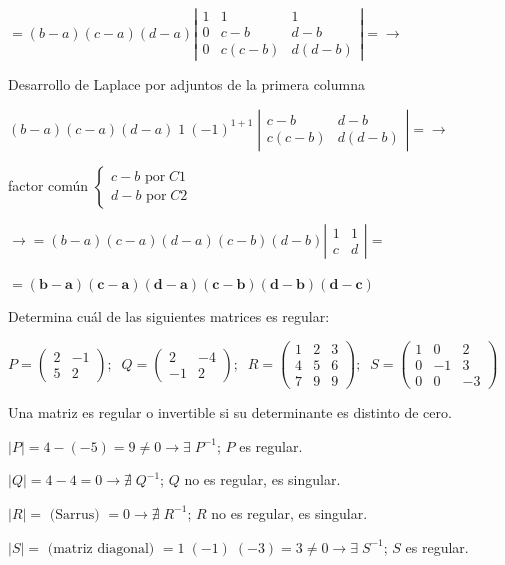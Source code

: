 \begin{proofw}
 \noindent $ = (b-a)(c-a)(d-a)\left| \begin{matrix}  1&1&1\\0&c-b&d-b\\0&c(c-b)&d(d-b) \end{matrix} \right| = \to$
 
 \noindent \textcolor{gris}{Desarrollo de Laplace por adjuntos de la primera columna} 
 
 \noindent $(b-a)(c-a)(d-a)\;1\:(-1)^{1+1}\; \left| \begin{matrix}  c-b&d-b\\c(c-b)&d(d-b) \end{matrix} \right| = \to $
 
 \noindent \textcolor{gris}{ factor común $\begin{cases} c-b \text{ por} \; C1 \\ d-b \text{ por} \; C2 \end{cases} $}
 
 \noindent $\to = (b-a)(c-a)(d-a)(c-b)(d-b) \left| \begin{matrix}  1&1\\c&d \end{matrix} \right|=$ 
 
 \noindent $=\boldsymbol{(b-a)(c-a)(d-a)(c-b)(d-b)(d-c)}$
 
\end{proofw}



\begin{ejre}
Determina cuál de las siguientes matrices es regular:

\noindent $P=\left( \begin{matrix} 2&-1\\5&2  \end{matrix} \right); \;\; 
Q=\left( \begin{matrix} 2&-4\\-1&2  \end{matrix} \right); \;\;
R=\left( \begin{matrix} 1&2&3\\4&5&6\\7&9&9  \end{matrix} \right); \;\;
S=\left( \begin{matrix} 1&0&2\\0&-1&3\\0&0&-3  \end{matrix} \right)$
\end{ejre}

\begin{proofw}\renewcommand{\qedsymbol}{$\diamond$}
Una matriz es regular o invertible si su determinante es distinto de cero.

\noindent $|P|=4-(-5)=9\neq 0 \to \exists \; P^{-1}$; $P$ es regular.

\noindent $|Q|=4-4=0 \to \nexists\;  Q^{-1}$; $Q$ no es regular, es singular.

\noindent $|R|=\text{ (Sarrus) }=0 \to \nexists \; R^{-1}$; $R$  no es regular, es singular.

\noindent $|S|= \text{ (matriz diagonal) }= 1\; (-1)\; (-3)=3\neq 0 \to \exists \;  S^{-1}$; $S$ es regular.
\end{proofw}


